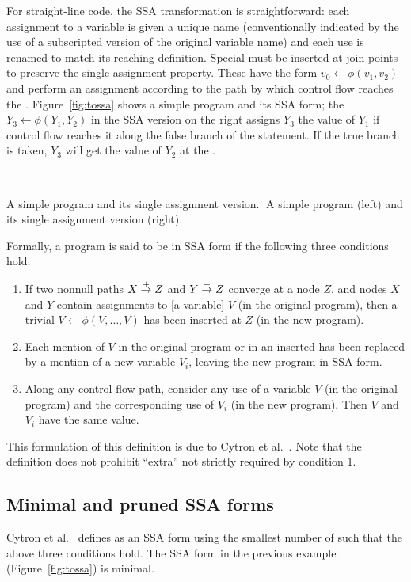 \documentclass[12pt,titlepage,twoside]{article}
\begin{document}
For straight-line code, the SSA transformation is straightforward:
each assignment to a variable is given a unique name (conventionally
indicated by the use of a subscripted version of the original variable
name) and each use is renamed to match its reaching definition.
Special  must be inserted at join points to
preserve the single-assignment property.  These  have
the form $v_0\gets\phi(v_1,v_2)$ and perform an assignment
according to the path by which control flow reaches the \phifunction.
Figure~\vref{fig:tossa} shows a simple program and its SSA form; the
\phifunction $Y_3\gets\phi(Y_1,Y_2)$ in the SSA version on the
right assigns $Y_3$ the value of $Y_1$ if control flow reaches it
along the false branch of the  statement.  If the true branch
is taken, $Y_3$ will get the value of $Y_2$ at the \phifunction.

\begin{myfigure}
\begin{center}
 \vline\ 
\end{center}
\caption
[A simple program and its single assignment version.]
{A simple program (left) and its single assignment version (right).
\label{fig:tossa}}
\end{myfigure}

Formally, a program is said to be in SSA form if the following three
conditions hold:
\begin{enumerate}
\item If two nonnull paths $X \stackrel{+}{\rightarrow} Z$ and $Y \stackrel{+}{\rightarrow} Z$
converge at a node $Z$, and nodes $X$ and $Y$ contain assignments to
[a variable] $V$ (in the original program), then a trivial
\phifunction{} $V \leftarrow \phi(V, \ldots, V)$ has been inserted at
$Z$ (in the new program).
\item Each mention of $V$ in the original program or in an inserted
\phifunction{} has been replaced by a mention of a new variable $V_i$,
leaving the new program in SSA form.
\item Along any control flow path, consider any use of a variable $V$
(in the original program) and the corresponding use of $V_i$ (in the
new program).  Then $V$ and $V_i$ have the same value.
\end{enumerate}
This formulation of this definition is due to Cytron et al.\ 
\cite{cytron91:ssa}.  Note that the definition does not prohibit
``extra'' \phifunction{s} not strictly required by condition 1.

\subsection{Minimal and pruned SSA forms}
Cytron et al.\ \cite{cytron91:ssa} defines  as
an SSA form using the smallest number of  such that the
above three conditions hold.  
The SSA form in the previous example (Figure~\vref{fig:tossa}) is minimal.
\end{document}
